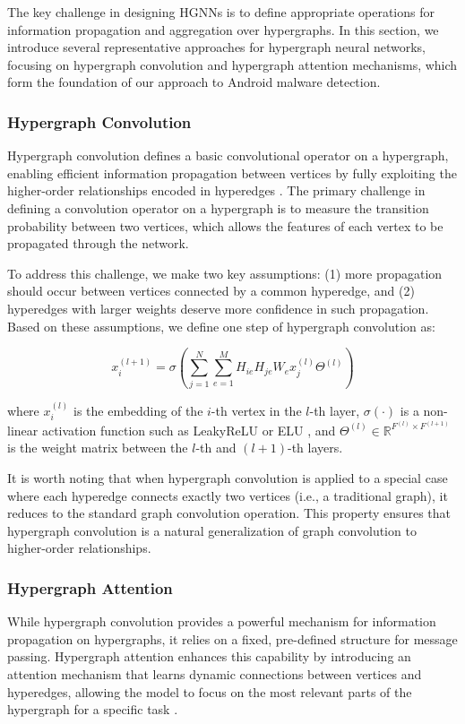 \documentclass[runningheads]{llncs}
\begin{document}
The key challenge in designing HGNNs is to define appropriate operations for information propagation and aggregation over hypergraphs. In this section, we introduce several representative approaches for hypergraph neural networks, focusing on hypergraph convolution and hypergraph attention mechanisms, which form the foundation of our approach to Android malware detection.


\subsubsection{Hypergraph Convolution}
Hypergraph convolution defines a basic convolutional operator on a hypergraph, enabling efficient information propagation between vertices by fully exploiting the higher-order relationships encoded in hyperedges \cite{bai2021}. The primary challenge in defining a convolution operator on a hypergraph is to measure the transition probability between two vertices, which allows the features of each vertex to be propagated through the network.

To address this challenge, we make two key assumptions: (1) more propagation should occur between vertices connected by a common hyperedge, and (2) hyperedges with larger weights deserve more confidence in such propagation. Based on these assumptions, we define one step of hypergraph convolution as:

\begin{equation}
x_i^{(l+1)} = \sigma\left(\sum_{j=1}^{N} \sum_{e=1}^{M} H_{ie} H_{je} W_e x_j^{(l)} \Theta^{(l)}\right)
\end{equation}

where $x_i^{(l)}$ is the embedding of the $i$-th vertex in the $l$-th layer, $\sigma(\cdot)$ is a non-linear activation function such as LeakyReLU \cite{maas2013rectifier} or ELU \cite{clevert2015fast}, and $\Theta^{(l)} \in \mathbb{R}^{F^{(l)} \times F^{(l+1)}}$ is the weight matrix between the $l$-th and $(l+1)$-th layers.


It is worth noting that when hypergraph convolution is applied to a special case where each hyperedge connects exactly two vertices (i.e., a traditional graph), it reduces to the standard graph convolution operation. This property ensures that hypergraph convolution is a natural generalization of graph convolution to higher-order relationships.



\subsubsection{Hypergraph Attention}
While hypergraph convolution provides a powerful mechanism for information propagation on hypergraphs, it relies on a fixed, pre-defined structure for message passing. Hypergraph attention enhances this capability by introducing an attention mechanism that learns dynamic connections between vertices and hyperedges, allowing the model to focus on the most relevant parts of the hypergraph for a specific task \cite{velickovic2018,lee2019attention}.
\end{document}
